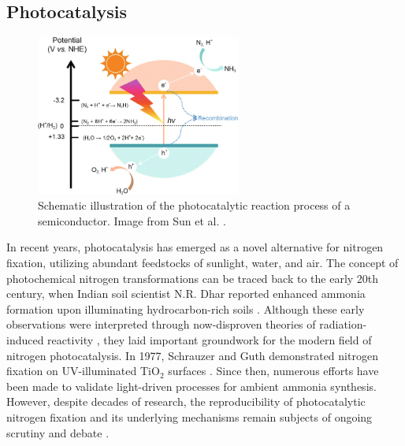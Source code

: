 \subsection{Photocatalysis}
\begin{figure}[h]
\centering
\includegraphics[width=0.6\textwidth]{figures/proposal_figures/Schematic_Sun.jpg}
\caption{Schematic illustration of the photocatalytic reaction process of a semiconductor. Image from Sun et al. \cite{Sun2023RecentReaction}.}
\label{fig:chen_photocata}
\end{figure}

In recent years, photocatalysis has emerged as a novel alternative for nitrogen fixation, utilizing abundant feedstocks of sunlight, water, and air. The concept of photochemical nitrogen transformations can be traced back to the early 20th century, when Indian soil scientist N.R. Dhar reported enhanced ammonia formation upon illuminating hydrocarbon-rich soils \cite{DHAR_1932}. Although these early observations were interpreted through now-disproven theories of radiation-induced reactivity \cite{lindemann1922discussion, Rao1932}, they laid important groundwork for the modern field of nitrogen photocatalysis. In 1977, Schrauzer and Guth demonstrated nitrogen fixation on UV-illuminated TiO$_2$ surfaces \cite{schrauzer1979nitrogen}. Since then, numerous efforts have been made to validate light-driven processes for ambient ammonia synthesis. However, despite decades of research, the reproducibility of photocatalytic nitrogen fixation and its underlying mechanisms remain subjects of ongoing scrutiny and debate \cite{Edwards1992, Davies1993, Davies_2007, hirakawa2017photocatalytic, Huang2023FormationIllumination, Huang2024BenchmarkingReaction}.


